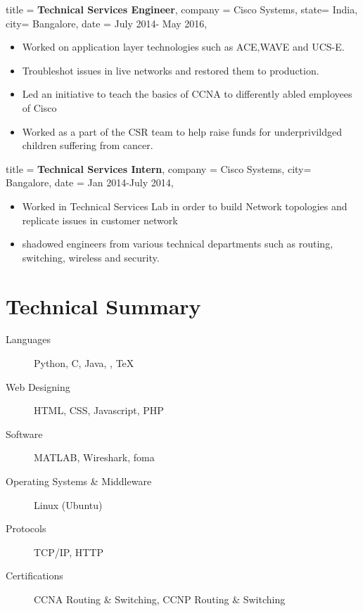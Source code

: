\documentclass{simplecv}
\begin{document}
\begin{position}
  {
      title   = \textbf{Technical Services Engineer},
      company = Cisco Systems,
      state= India,
      city= Bangalore,
      date    = July 2014- May 2016,
  }

  \begin{itemize}
      \item  Worked on application layer technologies such as ACE,WAVE and UCS-E. 
      \item  Troubleshot issues in live networks and restored them to production.
      \item  Led an initiative to teach the basics of CCNA to differently abled employees of Cisco
      \item  Worked as a part of the CSR team to help raise funds for underprivildged children suffering from cancer.
\end{itemize}
\end{position}
\vfill
\begin{position}
  {
      title   = \textbf{Technical Services Intern},
      company = Cisco Systems,
      city= Bangalore,
      date    = Jan 2014-July 2014,
  }

\begin{itemize}
    \item Worked in Technical Services Lab in order to build Network topologies and replicate issues in customer network
    \item shadowed engineers from various technical departments such as routing, switching, wireless and security.   
 \end{itemize}
\end{position}

\section{Technical Summary}
\begin{minipage}{\textwidth}
\begin{description}



 \item[Languages]
    Python,
    C,
    Java,
    \CPP,
    \TeX 
\item[Web  Designing]
    HTML,
    CSS,
    Javascript,
    PHP
  
\item[Software] 
    MATLAB,
    Wireshark,
    foma
     
\item [Operating  Systems \& Middleware]
     Linux (Ubuntu)
     
\item[Protocols]
    TCP/IP,
    HTTP
  
\item[Certifications]
	CCNA Routing  \& Switching,
	CCNP Routing \& Switching
      
\end{description}
\end{minipage}
\end{document}
